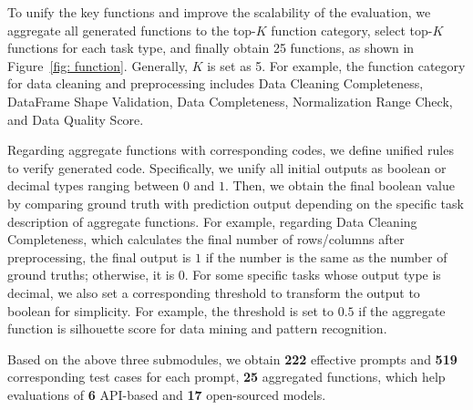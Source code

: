  To unify the key functions and improve the scalability of the evaluation, we aggregate all generated functions to the top-$K$ function category, select top-$K$ functions for each task type, and finally obtain 25 functions, as shown in Figure~\ref{fig: function}.
Generally, $K$ is set as 5. For example, the function category for data cleaning and preprocessing includes Data Cleaning Completeness, DataFrame Shape Validation, Data Completeness, Normalization Range Check, and Data Quality Score.


 Regarding aggregate functions with corresponding codes, we define unified rules to verify generated code.
Specifically, we unify all initial outputs as boolean or decimal types ranging between $0$ and $1$. Then, we obtain the final boolean value by comparing ground truth with prediction output depending on the specific task description of aggregate functions.
For example, regarding Data Cleaning Completeness, which calculates the final number of rows/columns after preprocessing, the final output is $1$ if the number is the same as the number of ground truths; otherwise, it is $0$.
For some specific tasks whose output type is decimal, we also set a corresponding threshold to transform the output to boolean for simplicity. For example, the threshold is set to $0.5$ if the aggregate function is silhouette score for data mining and pattern recognition.

 Based on the above three submodules, we obtain \textbf{222} effective prompts and \textbf{519} corresponding test cases for each prompt, \textbf{25} aggregated functions, which help evaluations of \textbf{6} API-based and \textbf{17} open-sourced models.